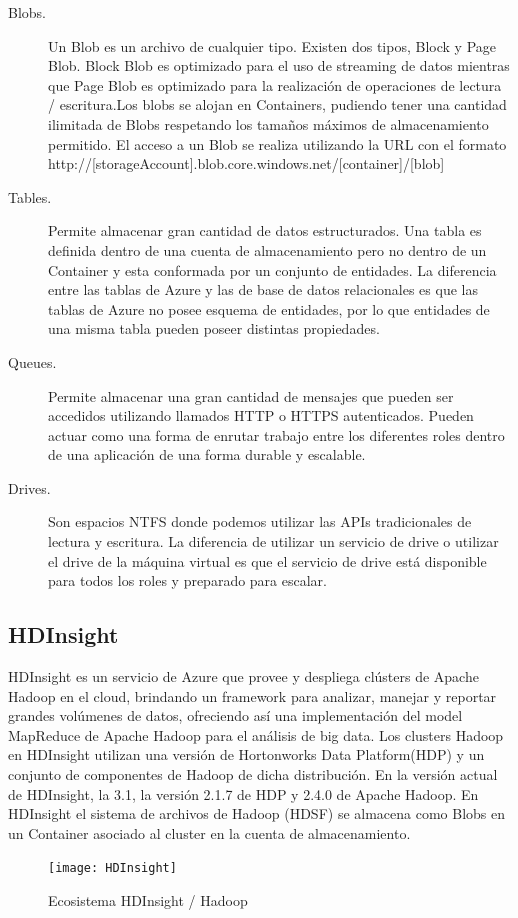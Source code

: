 \begin{description}

    \item [Blobs.] Un Blob es un archivo de cualquier tipo. Existen dos tipos, Block y Page Blob. Block Blob es optimizado para el uso de streaming de datos mientras que Page Blob es optimizado para la realización de operaciones de lectura / escritura.Los blobs se alojan en Containers, pudiendo tener una cantidad ilimitada de Blobs respetando los tamaños máximos de almacenamiento permitido. El acceso a un Blob se realiza utilizando la URL con el formato
          http://[storageAccount].blob.core.windows.net/[container]/[blob]

    \item [Tables.] Permite almacenar gran cantidad de datos estructurados. Una tabla es definida dentro de una cuenta de almacenamiento pero no dentro de un Container y esta conformada por un conjunto de entidades. La diferencia entre las tablas de Azure y las de base de datos relacionales es que las tablas de Azure no posee esquema de entidades, por lo que entidades de una misma tabla pueden poseer distintas propiedades.

    \item [Queues.] Permite almacenar una gran cantidad de mensajes que pueden ser accedidos utilizando llamados HTTP o HTTPS autenticados. Pueden actuar como una forma de enrutar trabajo entre los diferentes roles dentro de una aplicación de una forma durable y escalable.

    \item [Drives.] Son espacios NTFS donde podemos utilizar las APIs tradicionales de lectura y escritura. La diferencia de utilizar un servicio de drive o utilizar el drive de la máquina virtual es que el servicio de drive está disponible para todos los roles y preparado para escalar.


\end{description}

\subsection {HDInsight}
HDInsight es un servicio de Azure que provee y despliega clústers de Apache Hadoop \cite{hadoop} en el cloud, brindando un framework para analizar, manejar y reportar grandes volúmenes de datos, ofreciendo así una implementación del model MapReduce de Apache Hadoop para el análisis de big data. Los clusters Hadoop en HDInsight utilizan una versión de Hortonworks Data Platform(HDP) y un conjunto de componentes de Hadoop de dicha distribución. En la versión actual de HDInsight, la 3.1,   la versión 2.1.7 de HDP y 2.4.0 de Apache Hadoop. En HDInsight el sistema de archivos de Hadoop (HDSF) se almacena como Blobs en un Container asociado al cluster en la cuenta de almacenamiento.\\

\begin{figure}[h!]
    \centering
    \texttt{[image: HDInsight]}
    \caption{Ecosistema HDInsight / Hadoop}
    \label{fig:HDInsight}
\end{figure}
